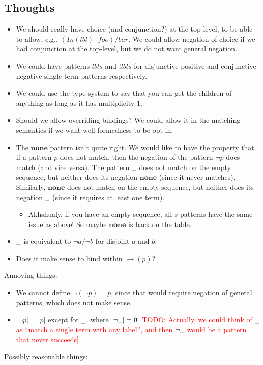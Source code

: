 \documentclass{article}
\newcommand{\RED}[1]{\textcolor{red}{#1}}
\newcommand{\TODO}[1]{\RED{[TODO: #1]}}
\newcommand{\lbl}{\ensuremath{\mathit{lbl}}}
\newcommand{\pseq}[2]{\ensuremath{#1 \cdot #2}}
\newcommand{\por}[2]{\ensuremath{#1/#2}}
\newcommand{\pnot}[1]{\ensuremath{\lnot #1}}
\newcommand{\any}{\ensuremath{\text{\underline{\hspace{0.6em}}}}}
\newcommand{\none}{\ensuremath{\mathbf{none}}}
\newcommand{\fb}[1]{\ensuremath{\rightarrow(#1)}}
\newcommand{\pin}[1]{\ensuremath{\mathit{In}(#1)}}
\begin{document}
\subsection{Thoughts}

\begin{itemize}
\item We should really have choice (and conjunction?) at the
  top-level, to be able to allow, e.g.,
  $\por{(\pseq{\pin{\lbl}}{\textit{foo}})}{bar}$. We could allow
  negation of choice if we had conjunction at the top-level, but
  we do not want general negation...
\item We could have patterns $\mathit{lbls}$ and $!\mathit{lbls}$
  for disjunctive positive and conjunctive negative single term
  patterns respectively.
\item We could use the type system to say that you can get the
  children of anything as long as it has multiplicity $1$.
\item Should we allow overriding bindings? We could allow it in
  the matching semantics if we want well-formedness to be opt-in.
\item The \none{} pattern isn't quite right. We would like to have
  the property that if a pattern $p$ does not match, then the
  negation of the pattern \pnot{p} does match (and vice versa).
  The pattern \any{} does not match on the empty sequence, but
  neither does its negation \none{} (since it never matches).
  Similarly, \none{} does not match on the empty sequence, but
  neither does its negation \any{} (since it requires at least one
  term).
  \begin{itemize}
  \item Akhshualy, if you have an empty sequence, all $s$ patterns
    have the same issue as above! So maybe \none{} is back on the
    table.
  \end{itemize}
\item \any{} is equivalent to \por{\pnot{a}}{\pnot{b}} for
  disjoint $a$ and $b$.
\item Does it make sense to bind within $\fb{p}$?
\end{itemize}
%
Annoying things:

\begin{itemize}
\item We cannot define $\lnot(\lnot p) = p$, since that would
  require negation of general patterns, which does not make sense.
\item $|\lnot p| = |p|$ except for $\any$, where $|\lnot\any| = 0$
  \TODO{Actually, we could think of \any{} as ``match a single
    term with any label'', and then \pnot{\any{}} would be a
    pattern that never succeeds}
\end{itemize}
%
Possibly reasonable things:
\end{document}
